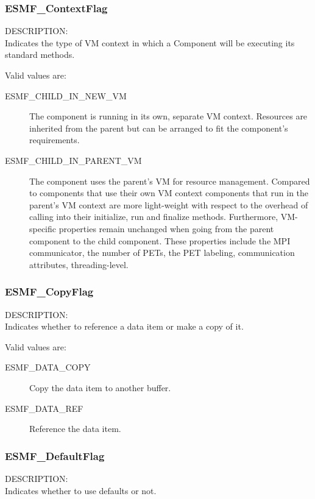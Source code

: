 \subsubsection{ESMF\_ContextFlag}
\label{opt:contextflag}
{\sf DESCRIPTION:\\}  
Indicates the type of VM context in which a Component will be executing its
standard methods.

Valid values are:
\begin{description}

\item [ESMF\_CHILD\_IN\_NEW\_VM]
         The component is running in its own, separate VM context. Resources
         are inherited from the parent but can be arranged to fit the
         component's requirements.
\item [ESMF\_CHILD\_IN\_PARENT\_VM]
         The component uses the parent's VM for resource management. Compared
         to components that use their own VM context components that run in the
         parent's VM context are more light-weight with respect to the overhead
         of calling into their initialize, run and finalize methods.
         Furthermore, VM-specific properties remain unchanged when going from
         the parent component to the child component. These properties include
         the MPI communicator, the number of PETs, the PET labeling, 
         communication attributes, threading-level.

\end{description}

\subsubsection{ESMF\_CopyFlag}
\label{opt:copyflag}
{\sf DESCRIPTION:\\}
Indicates whether to reference a data item or make a copy of it.

Valid values are:
\begin{description}
\item [ESMF\_DATA\_COPY]
      Copy the data item to another buffer.
\item [ESMF\_DATA\_REF]
      Reference the data item.
\end{description}

\subsubsection{ESMF\_DefaultFlag}
\label{opt:defaultflag}
{\sf DESCRIPTION:\\}
Indicates whether to use defaults or not.

